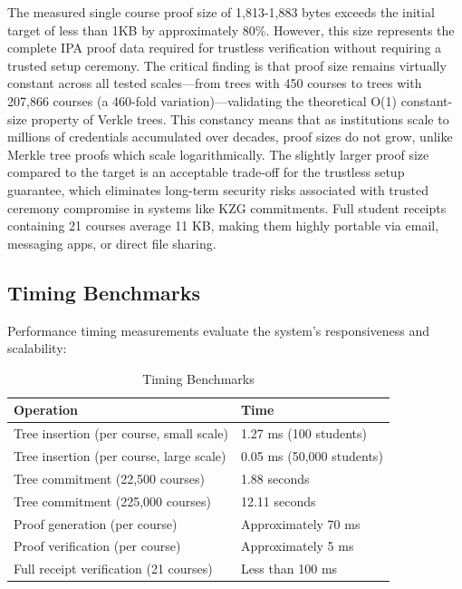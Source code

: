 The measured single course proof size of 1,813-1,883 bytes exceeds the initial target of less than 1KB by approximately 80\%. However, this size represents the complete IPA proof data required for trustless verification without requiring a trusted setup ceremony. The critical finding is that proof size remains virtually constant across all tested scales—from trees with 450 courses to trees with 207,866 courses (a 460-fold variation)—validating the theoretical O(1) constant-size property of Verkle trees. This constancy means that as institutions scale to millions of credentials accumulated over decades, proof sizes do not grow, unlike Merkle tree proofs which scale logarithmically. The slightly larger proof size compared to the target is an acceptable trade-off for the trustless setup guarantee, which eliminates long-term security risks associated with trusted ceremony compromise in systems like KZG commitments. Full student receipts containing 21 courses average 11 KB, making them highly portable via email, messaging apps, or direct file sharing.

\subsection{Timing Benchmarks}
\label{subsec:timing-benchmarks}

Performance timing measurements evaluate the system's responsiveness and scalability:

\begin{table}[H]
\centering
\caption{Timing Benchmarks}
\label{tab:timing-benchmarks}
\begin{tabular}{|p{7cm}|p{5cm}|}
\hline
\textbf{Operation} & \textbf{Time} \\
\hline
Tree insertion (per course, small scale) & 1.27 ms (100 students) \\
\hline
Tree insertion (per course, large scale) & 0.05 ms (50,000 students) \\
\hline
Tree commitment (22,500 courses) & 1.88 seconds \\
\hline
Tree commitment (225,000 courses) & 12.11 seconds \\
\hline
Proof generation (per course) & Approximately 70 ms \\
\hline
Proof verification (per course) & Approximately 5 ms \\
\hline
Full receipt verification (21 courses) & Less than 100 ms \\
\hline
\end{tabular}
\end{table}

